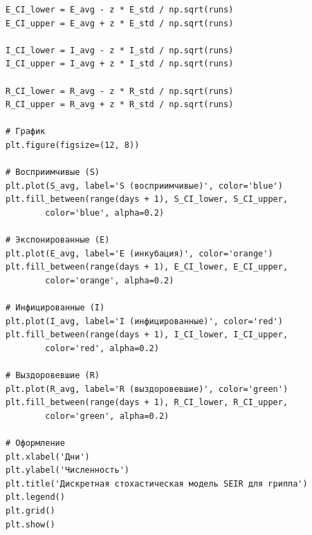 \documentclass[a4paper, 14pt]{extreport}
\numberwithin{equation}{section}
\begin{document}
\begin{verbatim}
E_CI_lower = E_avg - z * E_std / np.sqrt(runs)
E_CI_upper = E_avg + z * E_std / np.sqrt(runs)

I_CI_lower = I_avg - z * I_std / np.sqrt(runs)
I_CI_upper = I_avg + z * I_std / np.sqrt(runs)

R_CI_lower = R_avg - z * R_std / np.sqrt(runs)
R_CI_upper = R_avg + z * R_std / np.sqrt(runs)

# График
plt.figure(figsize=(12, 8))

# Восприимчивые (S)
plt.plot(S_avg, label='S (восприимчивые)', color='blue')
plt.fill_between(range(days + 1), S_CI_lower, S_CI_upper, 
		color='blue', alpha=0.2)

# Экспонированные (E)
plt.plot(E_avg, label='E (инкубация)', color='orange')
plt.fill_between(range(days + 1), E_CI_lower, E_CI_upper, 
		color='orange', alpha=0.2)

# Инфицированные (I)
plt.plot(I_avg, label='I (инфицированные)', color='red')
plt.fill_between(range(days + 1), I_CI_lower, I_CI_upper, 
		color='red', alpha=0.2)

# Выздоровевшие (R)
plt.plot(R_avg, label='R (выздоровевшие)', color='green')
plt.fill_between(range(days + 1), R_CI_lower, R_CI_upper, 
		color='green', alpha=0.2)

# Оформление
plt.xlabel('Дни')
plt.ylabel('Численность')
plt.title('Дискретная стохастическая модель SEIR для гриппа')
plt.legend()
plt.grid()
plt.show()
\end{verbatim}
\end{document}
